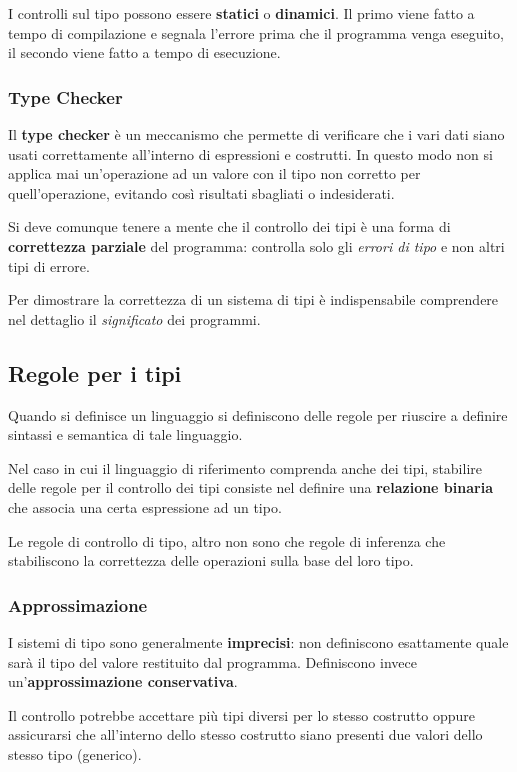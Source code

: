 I controlli sul tipo possono essere \textbf{statici} o \textbf{dinamici}. Il primo viene fatto a tempo di compilazione e
segnala l'errore prima che il programma venga eseguito, il secondo viene fatto a tempo di esecuzione.

\subsubsection{Type Checker}
Il \textbf{type checker} è un meccanismo che permette di verificare che i vari dati siano usati correttamente all'interno di
espressioni e costrutti. In questo modo non si applica mai un'operazione ad un valore con il tipo non corretto per
quell'operazione, evitando così risultati sbagliati o indesiderati.

Si deve comunque tenere a mente che il controllo dei tipi è una forma di \textbf{correttezza parziale} del programma:
controlla solo gli \emph{errori di tipo} e non altri tipi di errore.

Per dimostrare la correttezza di un sistema di tipi è indispensabile comprendere nel dettaglio il \emph{significato} dei
programmi.

\subsection{Regole per i tipi}
Quando si definisce un linguaggio si definiscono delle regole per riuscire a definire sintassi e semantica di tale
linguaggio.

Nel caso in cui il linguaggio di riferimento comprenda anche dei tipi, stabilire delle regole per il controllo dei tipi
consiste nel definire una \textbf{relazione binaria} che associa una certa espressione ad un tipo.

Le regole di controllo di tipo, altro non sono che regole di inferenza che stabiliscono la correttezza delle operazioni
sulla base del loro tipo.

\subsubsection{Approssimazione}
I sistemi di tipo sono generalmente \textbf{imprecisi}: non definiscono esattamente quale sarà il tipo del valore restituito
dal programma. Definiscono invece un'\textbf{approssimazione conservativa}.

Il controllo potrebbe accettare più tipi diversi per lo stesso costrutto oppure assicurarsi che all'interno dello stesso
costrutto siano presenti due valori dello stesso tipo (generico).

